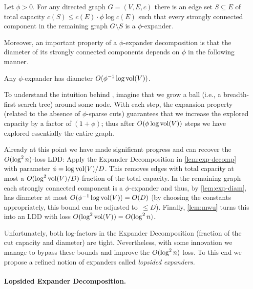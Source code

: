 \begin{lemma} \label{lem:exp-decomp}
Let $\phi > 0$. For any directed graph $G = (V, E, c)$ there is an edge set $S \subseteq E$ of total capacity $c(S) \leq c(E) \cdot \phi \log c(E)$ such that every strongly connected component in the remaining graph $G \setminus S$ is a $\phi$-expander.
\end{lemma}

Moreover, an important property of a $\phi$-expander decomposition is that the diameter of its strongly connected components depends on $\phi$ in the following manner. 

\begin{lemma} \label{lem:exp-diam}
Any $\phi$-expander has diameter $O(\phi^{-1} \log \operatorname{vol}(V))$.
\end{lemma}

To understand the intuition behind , imagine that we grow a ball (i.e., a breadth-first search tree) around some node. With each step, the expansion property (related to the absence of $\phi$-sparse cuts) guarantees that we increase the explored capacity by a factor of $(1 + \phi)$; thus after $O(\phi \log \operatorname{vol}(V))$ steps we have explored essentially the entire graph.

Already at this point we have made significant progress and can recover the $O(\log^2 n)$-loss LDD: Apply the Expander Decomposition in \cref{lem:exp-decomp} with parameter $\phi = \log \operatorname{vol}(V) / D$. This removes edges with total capacity at most a $O(\log^2 \operatorname{vol}(V) / D)$-fraction of the total capacity. In the remaining graph each strongly connected component is a $\phi$-expander and thus, by \cref{lem:exp-diam}, has diameter at most $O(\phi^{-1} \log\operatorname{vol}(V)) = O(D)$ (by choosing the constants appropriately, this bound can be adjusted to~$\leq D$). Finally, \cref{lem:mwu} turns this into an LDD with loss $O(\log^2 \operatorname{vol}(V)) = O(\log^2 n)$.

Unfortunately, both log-factors in the Expander Decomposition (fraction of the cut capacity and diameter) are tight. Nevertheless, with some innovation we manage to bypass these bounds and improve the $O(\log^2 n)$ loss. To this end we propose a refined notion of expanders called \emph{lopsided expanders.}

\paragraph{Lopsided Expander Decomposition.}

